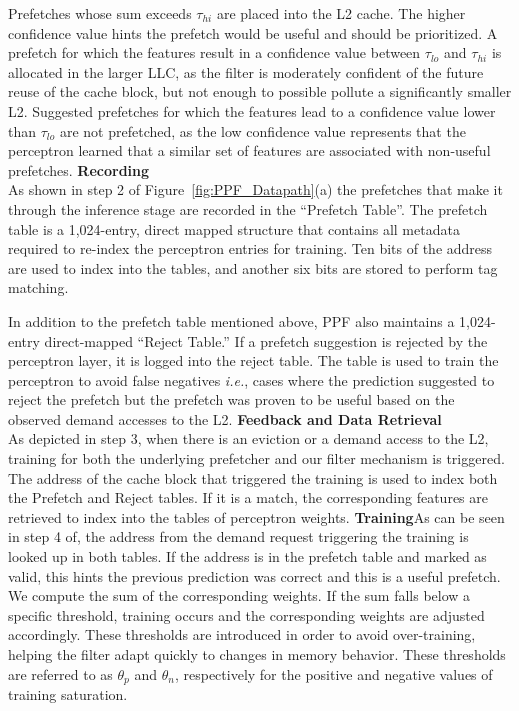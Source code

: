 Prefetches whose sum exceeds $\tau_{hi}$ are placed into the L2 cache.
The higher confidence value hints the prefetch would be useful and
should be prioritized.  A prefetch for which the features result in a
confidence value between $\tau_{lo}$ and $\tau_{hi}$ is allocated in
the larger LLC, as the filter is moderately confident of the future
reuse of the cache block, but not enough to possible pollute a
significantly smaller L2.  Suggested prefetches for which the features
lead to a confidence value lower than $\tau_{lo}$ are not prefetched,
as the low confidence value represents that the perceptron learned
that a similar set of features are associated with non-useful
prefetches.
\newline
\newline
\noindent \textbf{Recording}\\
As shown in step 2 of Figure~\ref{fig:PPF_Datapath}(a) the prefetches
that make it through the inference stage are recorded in the
``Prefetch Table''. The prefetch table is a 1,024-entry, direct mapped
structure that contains all metadata required to re-index the
perceptron entries for training. {Ten bits of the address are 
used to index into the tables, and another six bits are stored to 
perform tag matching.} 

In addition to the prefetch table mentioned above, PPF also maintains
a 1,024-entry direct-mapped ``Reject Table.'' If a prefetch suggestion
is rejected by the perceptron layer, it is logged into the reject
table. The table is used to train the perceptron to avoid false
negatives \textit{i.e.}, cases where the prediction suggested to
reject the prefetch but the prefetch was proven to be useful based on
the observed demand accesses to the L2.
\newline
\newline
\noindent \textbf{Feedback and Data Retrieval}\\
As depicted in step 3, when there is an eviction or a demand access 
to the L2, training for both the {underlying} prefetcher 
and our filter mechanism is triggered. The address of the cache block 
that triggered the training is used to index both the Prefetch and 
Reject tables. {If it is a match, the corresponding
features are retrieved to index into the tables of perceptron weights.}
%
%
\newline
\newline
\noindent \textbf{Training}\newline As can be seen in step 4 of, 
the address from the demand
request triggering the training is looked up in both tables. If the
address is in the prefetch table and marked as valid, this hints the
previous prediction was correct and this is a useful prefetch. We
compute the sum of the corresponding weights. If the sum falls below a
specific threshold, training occurs and the corresponding weights are
adjusted accordingly. These thresholds are introduced in order to
avoid over-training, helping the filter adapt quickly to changes in
memory behavior. These thresholds are referred to as $\theta_p$ and
$\theta_n$, respectively for the positive and negative values of
training saturation.

